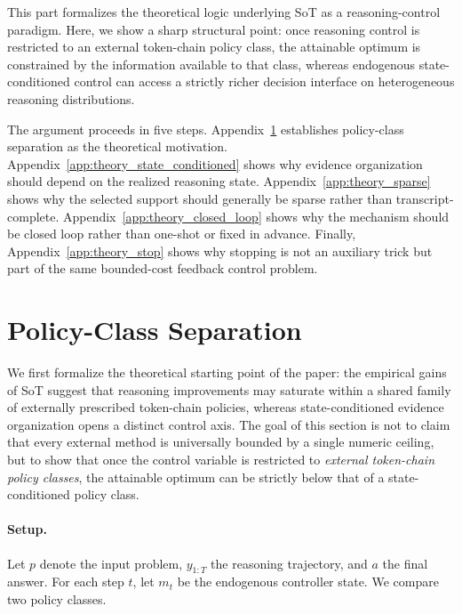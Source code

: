 This part formalizes the theoretical logic underlying SoT as a reasoning-control paradigm.
Here, we show a sharp structural point: once reasoning control is restricted to an external token-chain policy class, the attainable optimum is constrained by the information available to that class, whereas endogenous state-conditioned control can access a strictly richer decision interface on heterogeneous reasoning distributions.

The argument proceeds in five steps.
Appendix~\ref{app:theory_policy_class} establishes policy-class separation as the theoretical motivation.
Appendix~\ref{app:theory_state_conditioned} shows why evidence organization should depend on the realized reasoning state.
Appendix~\ref{app:theory_sparse} shows why the selected support should generally be sparse rather than transcript-complete.
Appendix~\ref{app:theory_closed_loop} shows why the mechanism should be closed loop rather than one-shot or fixed in advance.
Finally, Appendix~\ref{app:theory_stop} shows why stopping is not an auxiliary trick but part of the same bounded-cost feedback control problem.

\section{Policy-Class Separation}
\label{app:theory_policy_class}

We first formalize the theoretical starting point of the paper:
the empirical gains of SoT suggest that reasoning improvements may saturate within a shared family of externally prescribed token-chain policies, whereas state-conditioned evidence organization opens a distinct control axis.
The goal of this section is not to claim that every external method is universally bounded by a single numeric ceiling, but to show that once the control variable is restricted to \emph{external token-chain policy classes}, the attainable optimum can be strictly below that of a state-conditioned policy class.

\paragraph{Setup.}
Let \(p\) denote the input problem, \(y_{1:T}\) the reasoning trajectory, and \(a\) the final answer.
For each step \(t\), let \(m_t\) be the endogenous controller state.
We compare two policy classes.

